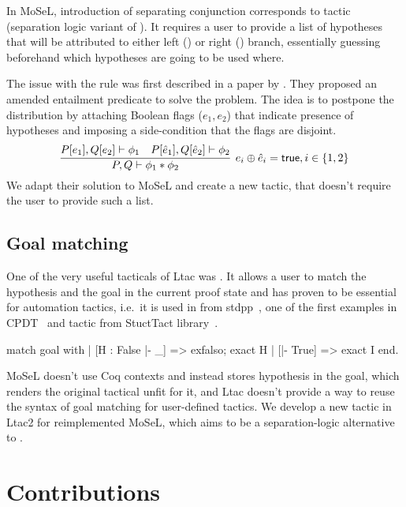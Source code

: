 In MoSeL, introduction of separating conjunction corresponds to  tactic (separation logic variant of ).
It requires a user to provide a list of hypotheses that will be attributed to either left () or right () branch, essentially guessing beforehand which hypotheses are going to be used where.

The issue with the rule was first described in a paper by \citet{harlandResourceDistributionBooleanConstraints2003}.
They proposed an amended entailment predicate to solve the problem.
The idea is to postpone the distribution by attaching Boolean flags (\(e_1, e_2\)) that indicate presence of hypotheses and imposing a side-condition that the flags are disjoint.
\[\infer[e_i \oplus \hat{e}_i = \true, i \in \{1,2\}]
        {P, Q \vdash \phi_1 \ast \phi_2}
        {P[e_1], Q[e_2] \vdash \phi_1 &
         P[\hat{e}_1], Q[\hat{e}_2] \vdash \phi_2} \]
We adapt their solution to MoSeL and create a new  tactic, that doesn't require the user to provide such a list.

\subsection{Goal matching}
\label{sec:goal-matching}

One of the very useful tacticals of Ltac was .
It allows a user to match the hypothesis and the goal in the current proof state and has proven to be essential for automation tactics, i.e.\ it is used in  from stdpp~\cite{std++developersandcontributorsStdpp}, one of the first examples in CPDT~\cite{chlipalaCertifiedProgrammingDependent2013} and  tactic from StuctTact library~\cite{uwplse-structtactdevelopmentteamStructTact2020}.
\begin{coq}
match goal with
| [H : False |- _] => exfalso; exact H
| [|- True] => exact I
end.
\end{coq}

MoSeL doesn't use Coq contexts and instead stores hypothesis in the goal, which renders the original tactical unfit for it, and Ltac doesn't provide a way to reuse the syntax of goal matching for user-defined tactics.
We develop a new tactic  in Ltac2 for reimplemented MoSeL, which aims to be a separation-logic alternative to .
  
\section{Contributions}
\label{sec:contributions}

